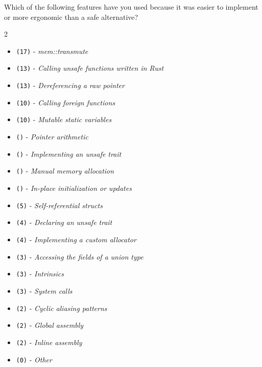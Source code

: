 \begin{protocol}
\item \label{survey:wueq1}  Which of the following \unsafe features have you used because it was easier to implement or more ergonomic than a safe alternative?
\begin{multicols}{2}
\begin{itemize}
\item \texttt{(17)} - \textit{mem::transmute}
\item \texttt{(13)} - \textit{Calling unsafe functions written in Rust}
\item \texttt{(13)} - \textit{Dereferencing a raw pointer}
\item \texttt{(10)} - \textit{Calling foreign functions}
\item \texttt{(10)} - \textit{Mutable static variables}
\item \texttt{()} - \textit{Pointer arithmetic}
\item \texttt{()} - \textit{Implementing an unsafe trait}
\item \texttt{()} - \textit{Manual memory allocation}
\item \texttt{()} - \textit{In-place initialization or updates}
\item \texttt{(5)} - \textit{Self-referential structs}
\item \texttt{(4)} - \textit{Declaring an unsafe trait}
\item \texttt{(4)} - \textit{Implementing a custom allocator}
\item \texttt{(3)} - \textit{Accessing the fields of a union type}
\item \texttt{(3)} - \textit{Intrinsics}
\item \texttt{(3)} - \textit{System calls}
\item \texttt{(2)} - \textit{Cyclic aliasing patterns}
\item \texttt{(2)} - \textit{Global assembly}
\item \texttt{(2)} - \textit{Inline assembly}
\item \texttt{(0)} - \textit{Other}
\end{itemize}
\end{multicols}
\end{protocol}

